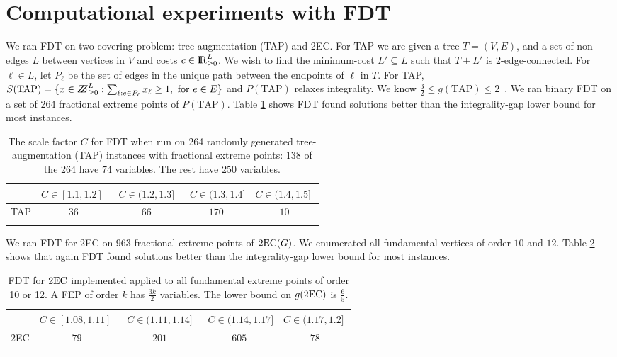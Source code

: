 \section{Computational experiments with FDT}\label{experiment}
We ran FDT on two covering problem: tree augmentation (TAP) and 2EC. For TAP we are given a tree $T=(V,E)$, and a set of non-edges $L$ between vertices in $V$ and costs $c\in {\rm I\!R}^{L}_{\geq 0}$. We wish to find the minimum-cost  $L'\subseteq L$ such that $T+L'$ is 2-edge-connected. For $\ell\in L$, let $P_\ell$ be the set of edges in the unique path between the endpoints of $\ell$ in $T$. For TAP, $S(\mbox{TAP})=\{x\in \bbbz^{L}_{\geq 0}: \sum_{\ell: e\in P_\ell}x_\ell \geq 1, \mbox{ for $e\in E$}\}$ and $P(\mbox{TAP})$ relaxes integrality. We know $\frac{3}{2}\leq g({\mbox{TAP}})\leq 2$~\cite{fj,32gap}. We ran binary FDT on a set of 264 fractional extreme points of $P(\mbox{TAP})$. Table \ref{tableTAP} shows FDT found solutions better than the integrality-gap lower bound for most instances.
\begin{table}[h]
	\centering
	  \begin{tabular}{c c c c c}
	  \toprule
	  	& $C\in [1.1,1.2]\;$ & $\;C\in (1.2,1.3]\;$ &
               $\;C\in (1.3,1.4]$ &\; $C\in (1.4,1.5]\;$ \\ \midrule
	  	TAP & $36$ & $66$ & $170$ & $10$\\  \bottomrule \\
	  \end{tabular}\caption{The scale factor $C$ for FDT when run on 264 randomly generated tree-augmentation (TAP) instances with fractional extreme points: 138 of the 264 have $74$ variables. The rest have $250$ variables.}
	  \label{tableTAP}
\end{table}
We ran FDT for 2EC on 963 fractional extreme points of $\operatorname{2EC}(G)$. We enumerated all fundamental vertices of order $10$ and $12$. Table \ref{table2EC} shows that again FDT found solutions better than the integrality-gap lower bound for most instances. 
\begin{table}[h]
	\centering
	  \begin{tabular}{c c c c c}
	  	\toprule
	  	& $C\in [1.08,1.11]\;$ & $\;C\in (1.11,1.14]\;$ &
               $\;C\in (1.14,1.17]$ &\; $C\in (1.17,1.2]\;$ \\ \midrule
	  	2EC & $79$ & $201$ & $605$ & $78$ \\ \bottomrule\\
	  \end{tabular}	\caption{FDT for $\operatorname{2EC}$ implemented applied to all fundamental extreme points of order 10 or 12. A FEP of order $k$ has $\frac{3k}{2}$ variables. The lower bound on $g(\operatorname{2EC})$ is $\frac{6}{5}$.}
	  \label{table2EC}
\end{table}
